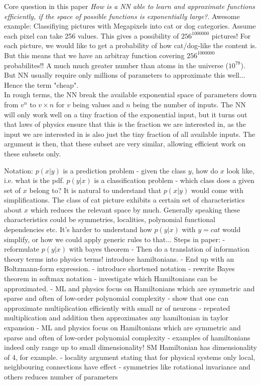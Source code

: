 Core question in this paper \emph{How is a NN able to learn and approximate
functions efficiently, if the space of possible functions is exponentially
large?}.
Awesome example: Classifiying pictures with Megapixels into cat or dog
categories. Assume each pixel can take 256 values. This gives a possibility of
$256^{1000000}$ pictures! For each picture, we would like to get a probability
of how cat/dog-like the content is. But this means that we have an arbitray
function covering $256^{1000000}$ probabilites!! A much much greater number than
atoms in the universe ($10^{78}$). But NN usually require only millions of
parameters to approximate this well... Hence the term "cheap".\\
In rough terms, the NN break the available exponential space of parameters down
from $v^n$ to $v\times n$ for $v$ being values and $n$ being the number of
inputs. The NN will only work well on a tiny fraction of the exponential input,
but it turns out that laws of physics ensure that this is the fraction we are
interested in, as the input we are interested in is also just the tiny fraction
of all available inputs. The argument is then, that these subset are very
similar, allowing efficient work on these subsets only.\par
Notation: $p(x|y)$ is a prediction problem - given the class $y$, how do $x$
look like, i.e. what is the pdf. $p(y|x)$ is a classification problem - which
class does a given set of $x$ belong to?
It is natural to understand that $p(x|y)$ would come with simplifications. The
class of cat picture exhibits a certain set of characteristics about $x$ which
reduces the relevant space by much. Generally speaking these characteristics
could be symmetries, localities, polynomial functional dependencies etc.
It's harder to understand how $p(y|x)$ with $y=cat$ would simplify, or how we
could apply generic rules to that...
Steps in paper: 
- reformulate $p(y|x)$ with bayes theorem
- Then do a translation of information theory terms into physics terms!
  introduce hamiltonians.
- End up with an Boltzmann-form expression.
- introduce shortened notation
- rewrite Bayes theorem in softmax notation
- investigate which Hamiltonians can be approximated. 
- ML and physics focus on Hamiltonians which are symmetric and sparse and often
  of low-order polynomial complexity
- show that one can approximate multiplication efficiently with small nr of
  neurons
- repeated multiplication and addition then approximates any hamiltonian  in
  taylor expansion
- ML and physics focus on Hamiltonians which are symmetric and sparse and often
  of low-order polynomial complexity
- examples of hamiltonians indeed only range up to small dimensionality! SM
  Hamiltonian has dimensionality of 4, for example.
- locality argument stating that for physical systems only local, neighbouring
  connections have effect
- symmetries like rotational invariance and others reduces number of parameters

